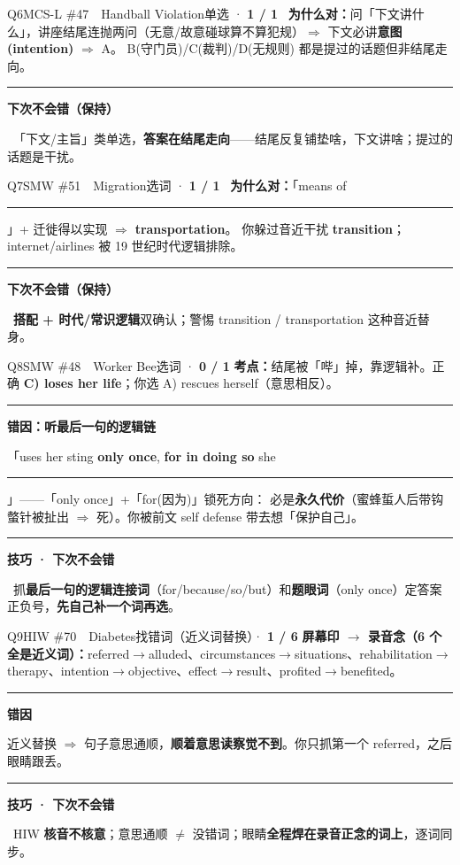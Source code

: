 \documentclass[11pt]{article}
\newcommand{\sfull}[1]{\textcolor{cFix}{\bfseries #1}}
\newcommand{\yes}{{\color{cFix}\ding{51}}}
\newcommand{\ptesub}[1]{%
  \par\needspace{2\baselineskip}\smallskip
  {\color{cAccent}\rule[-0.2ex]{3pt}{1.05em}}\hspace{6pt}%
  {\bfseries\color{cHead}#1}\par\nopagebreak\smallskip}
\begin{document}
\begin{qblock}{Q6\quad MCS-L \#47\ \ Handball Violation}{单选 · \textcolor{cFix}{\bfseries 1 / 1}\ \yes}
\textbf{为什么对：}问「下文讲什么」，讲座结尾连抛两问（无意/故意碰球算不算犯规）$\Rightarrow$ 下文必讲\textbf{意图(intention)} $\Rightarrow$ A。
B(守门员)/C(裁判)/D(无规则) 都是提过的话题但非结尾走向。
\ptesub{下次不会错（保持）}
\begin{notebox}\small
\yes\ 「下文/主旨」类单选，\textbf{答案在结尾走向}——结尾反复铺垫啥，下文讲啥；提过的话题是干扰。
\end{notebox}
\end{qblock}

\begin{qblock}{Q7\quad SMW \#51\ \ Migration}{选词 · \textcolor{cFix}{\bfseries 1 / 1}\ \yes}
\textbf{为什么对：}「means of \rule{0.8cm}{0.4pt}」+ 迁徙得以实现 $\Rightarrow$ \textbf{transportation}。
你躲过音近干扰 \textbf{transition}；internet/airlines 被 19 世纪时代逻辑排除。
\ptesub{下次不会错（保持）}
\begin{notebox}\small
\yes\ \textbf{搭配 + 时代/常识逻辑}双确认；警惕 transition / transportation 这种音近替身。
\end{notebox}
\end{qblock}

\begin{qblock}{Q8\quad SMW \#48\ \ Worker Bee}{选词 · \textcolor{cWrong}{\bfseries 0 / 1}}
\textbf{考点：}结尾被「哔」掉，靠逻辑补。正确 \sfull{C) loses her life}；你选 A) rescues herself（意思相反）。
\ptesub{错因：听最后一句的逻辑链}
「uses her sting \textbf{only once}, \textbf{for in doing so} she \rule{0.8cm}{0.4pt}」——「only once」+「for(因为)」锁死方向：
必是\textbf{永久代价}（蜜蜂蜇人后带钩螫针被扯出 $\Rightarrow$ 死）。你被前文 self defense 带去想「保护自己」。
\ptesub{技巧 · 下次不会错}
\begin{notebox}\small
\yes\ 抓\textbf{最后一句的逻辑连接词}（for/because/so/but）和\textbf{题眼词}（only once）定答案正负号，\textbf{先自己补一个词再选}。
\end{notebox}
\end{qblock}

\begin{qblock}{Q9\quad HIW \#70\ \ Diabetes}{找错词（近义词替换）· \textcolor{cWrong}{\bfseries 1 / 6}}
\textbf{屏幕印 $\to$ 录音念（6 个全是近义词）：}referred$\to$alluded、circumstances$\to$situations、rehabilitation$\to$therapy、intention$\to$objective、effect$\to$result、profited$\to$benefited。
\ptesub{错因}
近义替换 $\Rightarrow$ 句子意思通顺，\textbf{顺着意思读察觉不到}。你只抓第一个 referred，之后眼睛跟丢。
\ptesub{技巧 · 下次不会错}
\begin{notebox}\small
\yes\ HIW \textbf{核音不核意}；意思通顺 $\ne$ 没错词；眼睛\textbf{全程焊在录音正念的词上}，逐词同步。
\end{notebox}
\end{qblock}
\end{document}
